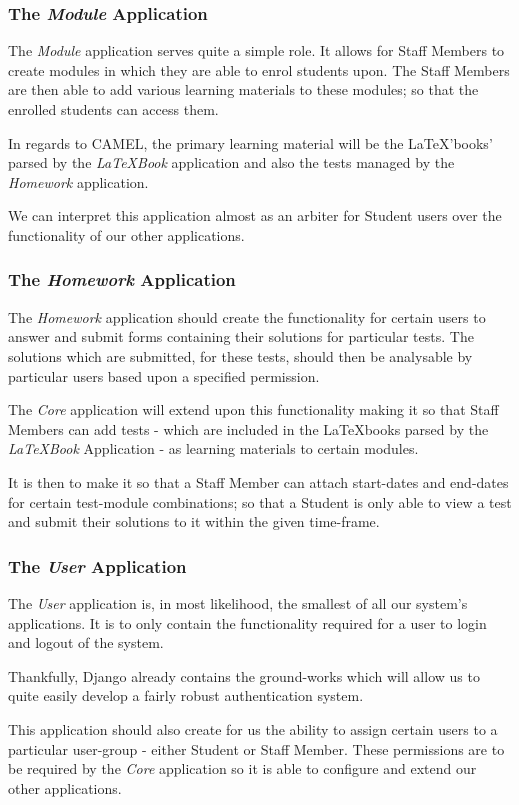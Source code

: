 	\subsubsection{The \textit{Module} Application}
		The \textit{Module} application serves quite a simple role. It allows for Staff Members to create modules in which they are able to enrol students upon. The Staff Members are then able to add various learning materials to these modules; so that the enrolled students can access them.
		
		In regards to CAMEL, the primary learning material will be the \LaTeX 'books' parsed by the \textit{\LaTeX Book} application and also the tests managed by the \textit{Homework} application.
		
		We can interpret this application almost as an arbiter for Student users over the functionality of our other applications.
		
	
	\subsubsection{The \textit{Homework} Application}
		The \textit{Homework} application should create the functionality for certain users to answer and submit forms containing their solutions for particular tests. The solutions which are submitted, for these tests, should then be analysable by particular users based upon a specified permission.
		
		The \textit{Core} application will extend upon this functionality making it so that Staff Members can add tests - which are included in the \LaTeX books parsed by the \textit{\LaTeX Book} Application - as learning materials to certain modules.
		
		It is then to make it so that a Staff Member can attach start-dates and end-dates for certain test-module combinations; so that a Student is only able to view a test and submit their solutions to it within the given time-frame.
		
	\subsubsection{The \textit{User} Application}
		The \textit{User} application is, in most likelihood, the smallest of all our system's applications. It is to only contain the functionality required for a user to login and logout of the system.
		
		Thankfully, Django already contains the ground-works which will allow us to quite easily develop a fairly robust authentication system.
		
		This application should also create for us the ability to assign certain users to a particular user-group - either Student or Staff Member. These permissions are to be required by the \textit{Core} application so it is able to configure and extend our other applications.